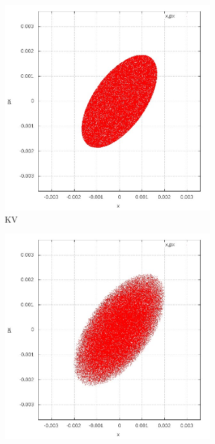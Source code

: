 \begin{figure}[!htb]
    \centering
    \begin{subfigure}[b]{0.48\textwidth}
        \includegraphics[width=\textwidth]{Img/KV_x_dx.jpg}
        \caption{KV}
    \end{subfigure}
    \begin{subfigure}[b]{0.48\textwidth}
        \includegraphics[width=\textwidth]{Img/WB_x_dx.jpg}

\end{subfigure}
\end{figure}
